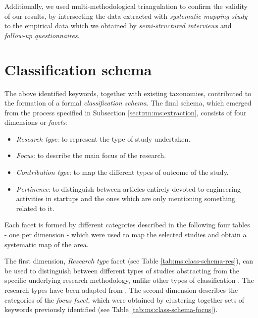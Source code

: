 \documentclass[final,5p,times,twocolumn]{elsarticle}
\begin{document}
Additionally, we used multi-methodological triangulation \cite{Wood,Kasunic2005} to confirm the validity of our results, by intersecting the data extracted with \textit{systematic mapping study} to the empirical data which we obtained by \textit{semi-structured interviews} and \textit{follow-up questionnaires}. 

 

\section{Classification schema} %
 \label{sect:schema}

 The above identified keywords, together with existing taxonomies, contributed to the formation of a formal \textit{classification schema}. The final schema, which emerged from the process specified in Subsection \ref{sect:rm:ms:extraction}, consists of four dimensions or \textit{facets}:

\par\vspace {0.4cm}
\begin{itemize}

\item \textit{Research type}: to represent the type of study undertaken.
\item \textit{Focus}: to describe the main focus of the research.
\item \textit{Contribution type}: to map the different types of outcome of the study.
\item \textit{Pertinence}: to distinguish between articles entirely devoted to engineering activities in startups and the ones which are only mentioning something related to it.
\end{itemize}
\par\vspace {0.4cm}

Each facet is formed by different categories described in the following four tables - one per dimension - which were used to map the selected studies and obtain a systematic map of the area.



The first dimension,  \textit{Research type} facet (see Table \ref{tab:ms:class-schema-res}), can be used to distinguish between different types of studies abstracting from the specific underlying research methodology, unlike other types of classification \cite{Ivarsson2010}. The research types have been adapted from \cite{Wieringa:2005}. The second dimension describes the categories of the \textit{focus facet}, which were obtained by clustering together sets of keywords previously identified (see Table \ref{tab:ms:class-schema-focus}).
\end{document}
